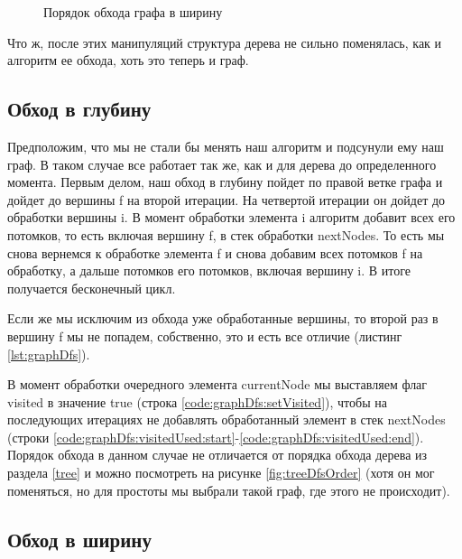 \documentclass[../../article.tex]{subfiles}
\begin{document}
\begin{figure}
    \caption{Порядок обхода графа в ширину}
    \label{fig:graphBfsOrder}
\end{figure}

Что ж, после этих манипуляций структура дерева не сильно поменялась, как и алгоритм ее обхода, хоть это теперь и граф.

\subsection{Обход в глубину}

Предположим, что мы не стали бы менять наш алгоритм и подсунули ему наш граф. В таком случае все работает так же, как и для дерева до определенного момента. Первым делом, наш обход в глубину пойдет по правой ветке графа и дойдет до вершины {\firacodebold f} на второй итерации. На четвертой итерации он дойдет до обработки вершины {\firacodebold i}. В момент обработки элемента {\firacodebold i} алгоритм добавит всех его потомков, то есть включая вершину {\firacodebold f}, в стек обработки {\firacodebold nextNodes}. То есть мы снова вернемся к обработке элемента {\firacodebold f} и снова добавим всех потомков {\firacodebold f} на обработку, а дальше потомков его потомков, включая вершину {\firacodebold i}. В итоге получается бесконечный цикл.

Если же мы исключим из обхода уже обработанные вершины, то второй раз в вершину {\firacodebold f} мы не попадем, собственно, это и есть все отличие (листинг \ref{lst:graphDfs}).

В момент обработки очередного элемента {\firacodebold currentNode} мы выставляем флаг {\firacodebold visited} в значение {\firacodebold true} (строка \ref{code:graphDfs:setVisited}), чтобы на последующих итерациях не добавлять обработанный элемент в стек {\firacodebold nextNodes} (строки \ref{code:graphDfs:visitedUsed:start}-\ref{code:graphDfs:visitedUsed:end}). Порядок обхода в данном случае не отличается от порядка обхода дерева из раздела \ref{tree} и можно посмотреть на рисунке \ref{fig:treeDfsOrder} (хотя он мог поменяться, но для простоты мы выбрали такой граф, где этого не происходит).

\subsection{Обход в ширину}
\end{document}
